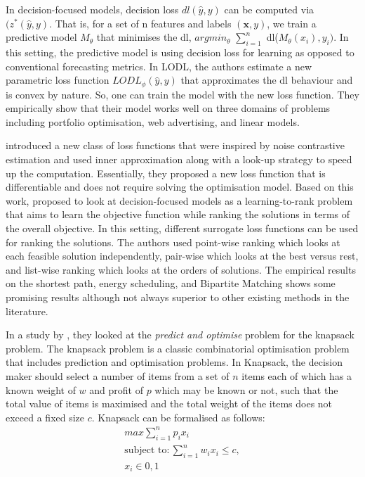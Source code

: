 \documentclass[graybox]{svmult}
\begin{document}
In decision-focused models, decision loss $dl(\hat{y},y)$ can be computed via $(z^*(\hat{y}, y)$. That is, for a set of n features and labels $(\textbf{x},y)$, we train a predictive model $M_\theta$ that minimises the dl, $argmin_\theta$ $\sum_{i=1}^{n}$ dl($M_\theta(x_i),y_i)$. In this setting, the predictive model is using decision loss for learning as opposed to conventional forecasting metrics. In LODL, the authors estimate a new parametric loss function $LODL_\phi(\hat{y}, y)$ that approximates the dl behaviour and is convex by nature. So, one can train the model with the new loss function. They empirically show that their model works well on three domains of problems including portfolio optimisation, web advertising, and linear models.


\citet{mulamba2020contrastive} introduced a new class of loss functions that were inspired by noise contrastive estimation and used inner approximation along with a look-up strategy to speed up the computation. Essentially, they proposed a new loss function that is differentiable and does not require solving the optimisation model. Based on this work, \cite{mandi2022decision} proposed to look at decision-focused models as a learning-to-rank problem that aims to learn the objective function while ranking the solutions in terms of the overall objective. In this setting, different surrogate loss functions can be used for ranking the solutions. The authors used point-wise ranking which looks at each feasible solution independently, pair-wise which looks at the best versus rest, and list-wise ranking which looks at the orders of solutions. The empirical results on the shortest path, energy scheduling, and Bipartite Matching shows some promising results although not always superior to other existing methods in the literature.  

In a study by \citet{demirovic2019investigation}, they looked at the \textit{predict and optimise} problem for the knapsack problem. The knapsack problem is a classic combinatorial optimisation problem that includes prediction and optimisation problems. In Knapsack, the decision maker should select a number of items from a set of $n$ items each of which has a known weight of $w$ and profit of $p$ which may be known or not, such that the total value of items is maximised and the total weight of the items does not exceed a fixed size $c$. Knapsack can be formalised as follows:
\begin{align}
max \sum_{i=1}^{n} p_i x_i\\\nonumber
\text{subject~to}:
\sum_{i=1}^{n} w_ix_i \leq c, \\\nonumber
x_i \in {0,1} 
\end{align}\label{knapsack}
\end{document}
